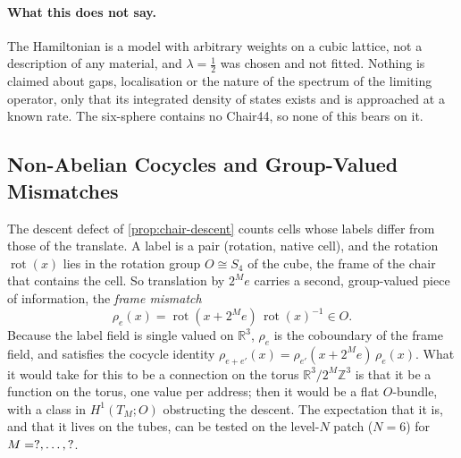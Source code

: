 \documentclass[11pt,a4paper]{article}
\newcommand{\ZZ}{\mathbb{Z}}
\newcommand{\RR}{\mathbb{R}}
\theoremstyle{plain}
\theoremstyle{definition}
\begin{document}
\paragraph{What this does not say.} The Hamiltonian is a model with arbitrary weights on a cubic lattice, not a description of any material, and $\lambda=\tfrac12$ was chosen
and not fitted. Nothing is claimed about gaps, localisation or the nature of the spectrum of the limiting operator, only that its
integrated density of states exists and is approached at a known rate. The six-sphere contains no Chair44, so none of this bears on it.

\subsection{Non-Abelian Cocycles and Group-Valued Mismatches}
\label{sec:chair-mismatch}

The descent defect of \cref{prop:chair-descent} counts cells whose labels differ from those of the translate. A label is a pair
(rotation, native cell), and the rotation $\operatorname{rot}(x)$ lies in the rotation group $O\cong S_4$ of the cube, the frame of
the chair that contains the cell. So translation by $2^Me$ carries a second, group-valued piece of information, the
\emph{frame mismatch}
\[
  \rho_e(x)=\operatorname{rot}(x+2^Me)\,\operatorname{rot}(x)^{-1}\in O .
\]
Because the label field is single valued on $\RR^3$, $\rho_e$ is the coboundary of the frame field, and satisfies the cocycle identity
$\rho_{e+e'}(x)=\rho_{e'}(x+2^Me)\,\rho_e(x)$. What it would take for this to be a connection on the torus $\RR^3/2^M\ZZ^3$ is that it be a
function on the torus, one value per address; then it would be a flat $O$-bundle, with a class in $H^1(T_M;O)$ obstructing the descent. The
expectation that it is, and that it lives on the tubes, can be tested on the level-$N$ patch ($N=6$) for $M=?,\dots,?$.
\end{document}

